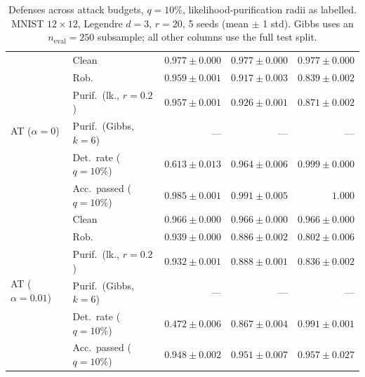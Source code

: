 \begin{table}[htbp]
\begin{tabular}{@{}llrrr@{}}
    \cmidrule(lr){1-5}
    \multirow{6}{*}{AT ($\alpha{=}0$)} & Clean & $0.977 \pm 0.000$ & $0.977 \pm 0.000$ & $0.977 \pm 0.000$ \\
     & Rob. & $\mathbf{0.959 \pm 0.001}$ & $\mathbf{0.917 \pm 0.003}$ & $\mathbf{0.839 \pm 0.002}$ \\
     & Purif.\ (lk., $r{=}0.2$) & $\mathbf{0.957 \pm 0.001}$ & $\mathbf{0.926 \pm 0.001}$ & $\mathbf{0.871 \pm 0.002}$ \\
     & Purif.\ (Gibbs, $k{=}6$) & --- & --- & --- \\
     & Det.\ rate ($q{=}10\%$) & $\mathbf{0.613 \pm 0.013}$ & $\mathbf{0.964 \pm 0.006}$ & $\mathbf{0.999 \pm 0.000}$ \\
     & Acc.\ passed ($q{=}10\%$) & $\mathbf{0.985 \pm 0.001}$ & $\mathbf{0.991 \pm 0.005}$ & $\mathbf{1.000}$ \\
    \cmidrule(lr){1-5}
    \multirow{6}{*}{AT ($\alpha{=}0.01$)} & Clean & $0.966 \pm 0.000$ & $0.966 \pm 0.000$ & $0.966 \pm 0.000$ \\
     & Rob. & $0.939 \pm 0.000$ & $0.886 \pm 0.002$ & $0.802 \pm 0.006$ \\
     & Purif.\ (lk., $r{=}0.2$) & $0.932 \pm 0.001$ & $0.888 \pm 0.001$ & $0.836 \pm 0.002$ \\
     & Purif.\ (Gibbs, $k{=}6$) & --- & --- & --- \\
     & Det.\ rate ($q{=}10\%$) & $0.472 \pm 0.006$ & $0.867 \pm 0.004$ & $0.991 \pm 0.001$ \\
     & Acc.\ passed ($q{=}10\%$) & $0.948 \pm 0.002$ & $0.951 \pm 0.007$ & $0.957 \pm 0.027$ \\
    \bottomrule
  \end{tabular}
  \caption{Defenses across attack budgets, $q{=}10\%$, likelihood-purification radii as labelled. MNIST $12\times12$, Legendre $d{=}3$, $r{=}20$, 5 seeds (mean $\pm$ 1 std). Gibbs uses an $n_{\mathrm{eval}}=250$ subsample; all other columns use the full test split.}
  \label{tab:mnist_r12_models_r20}
\end{table}
